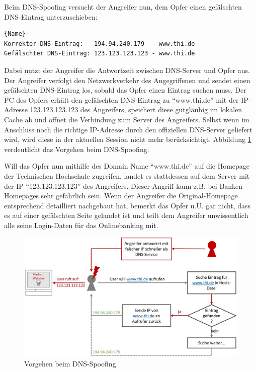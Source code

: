 Beim DNS-Spoofing versucht der Angreifer nun, dem Opfer einen gefälschten DNS-Eintrag unterzuschieben:
\begin{lstlisting}[caption=Echtes vs. gefälschtes DNS]{Name}
Korrekter DNS-Eintrag:   194.94.240.179  - www.thi.de
Gefälschter DNS-Eintrag: 123.123.123.123 - www.thi.de
\end{lstlisting}

Dabei nutzt der Angreifer die Antwortzeit zwischen DNS-Server und Opfer aus. Der Angreifer verfolgt den Netzwerkverkehr des Angegriffenen und sendet einen gefälschten DNS-Eintrag los, sobald das Opfer einen Eintrag suchen muss. Der PC des Opfers erhält den gefälschten DNS-Eintrag zu \enquote{www.thi.de} mit der IP-Adresse 123.123.123.123 des Angreifers, speichert diese gutgläubig im lokalen Cache ab und öffnet die Verbindung zum Server des Angreifers. Selbst wenn im Anschluss noch die richtige IP-Adresse durch den offiziellen DNS-Server geliefert wird, wird diese in der aktuellen Session nicht mehr berücksichtigt. Abbildung \ref{fig:poisoned_dns_lookup} verdeutlicht das Vorgehen beim DNS-Spoofing.

Will das Opfer nun mithilfe des Domain Name \enquote{www.thi.de} auf die Homepage der Technischen Hochschule zugreifen, landet es stattdessen auf dem Server mit der IP \enquote{123.123.123.123} des Angreifers. Dieser Angriff kann z.B. bei Banken-Homepages sehr gefährlich sein. Wenn der Angreifer die Original-Homepage entsprechend detailliert nachgebaut hat, bemerkt das Opfer u.U. gar nicht, dass es auf einer gefälschten Seite gelandet ist und teilt dem Angreifer unwissentlich alle seine Login-Daten für das Onlinebanking mit.

\begin{figure}[H]
	\centering
	\includegraphics[width=\textwidth]{images/dns_spoofing/poisoned_dns_lookup.jpg}
	\caption{Vorgehen beim DNS-Spoofing}
	\label{fig:poisoned_dns_lookup}
\end{figure}

